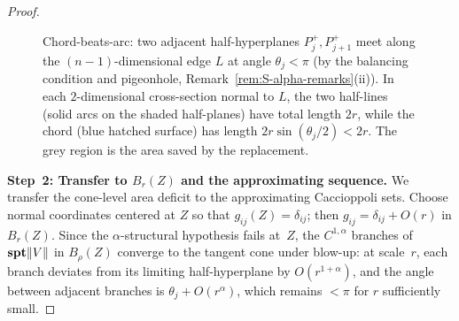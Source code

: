 \begin{proof}
\begin{figure}[ht]
        \caption{Chord-beats-arc: two adjacent half-hyperplanes $P_j^+, P_{j+1}^+$ meet along the $(n-1)$-dimensional edge $L$ at angle $\theta_j < \pi$ (by the balancing condition and pigeonhole, Remark~\ref{rem:S-alpha-remarks}(ii)). In each $2$-dimensional cross-section normal to $L$, the two half-lines (solid arcs on the shaded half-planes) have total length $2r$, while the chord (blue hatched surface) has length $2r\sin(\theta_j/2) < 2r$. The grey region is the area saved by the replacement.}
        \label{fig:chord-beats-arc}
    \end{figure}

\medskip\noindent\textbf{Step~2: Transfer to $B_r(Z)$ and the approximating sequence.}
We transfer the cone-level area deficit to the approximating Caccioppoli sets. Choose normal coordinates centered at $Z$ so that $g_{ij}(Z) = \delta_{ij}$; then $g_{ij} = \delta_{ij} + O(r)$ in $B_r(Z)$. Since the $\alpha$-structural hypothesis fails at~$Z$, the $C^{1,\alpha}$ branches of $\mathbf{spt}\|V\|$ in $B_\rho(Z)$ converge to the tangent cone under blow-up: at scale~$r$, each branch deviates from its limiting half-hyperplane by $O(r^{1+\alpha})$, and the angle between adjacent branches is $\theta_j + O(r^\alpha)$, which remains $< \pi$ for $r$ sufficiently small.


\end{proof}
